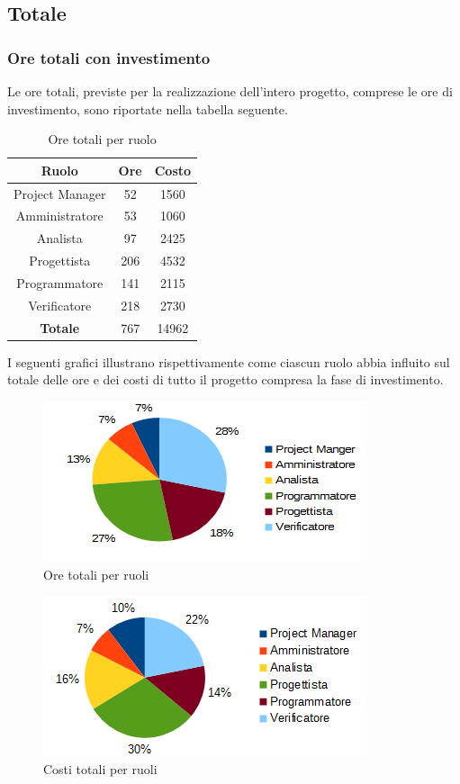	\subsection{Totale}
		\subsubsection{Ore totali con investimento}
		Le ore totali, previste per la realizzazione dell'intero progetto, comprese le ore di investimento, sono riportate nella tabella seguente. \\
		\begin{table}[H]
		\centering
		\begin{tabular}{|c|c|c|}
			\hline
			\textbf{Ruolo}		& \textbf{Ore}	& \textbf{Costo} \\
			\hline
			Project Manager		& 52			& 1560	\\
			Amministratore		& 53			& 1060	\\
			Analista			& 97			& 2425	\\
			Progettista			& 206			& 4532	\\
			Programmatore		& 141			& 2115	\\
			Verificatore		& 218			& 2730	\\
			\hline
			\textbf{Totale}		& 767			& 14962	\\
			\hline
		\end{tabular}
		\caption{Ore totali per ruolo}
		\end{table}
		I seguenti grafici illustrano rispettivamente come ciascun ruolo abbia influito sul totale delle ore e dei costi di tutto il progetto compresa la fase di investimento. \\
		\begin{figure}[H]
		\centering
			\includegraphics[scale=1]{immagini/grafici/riepilogo_conclusivo-torta.png}
			\caption{Ore totali per ruoli}
		\end{figure}
		\begin{figure}[H]
			\centering
			\includegraphics[scale=1]{immagini/grafici/riepilogo_conclusivo-torta-costo.png}
			\caption{Costi totali per ruoli}
		\end{figure}

